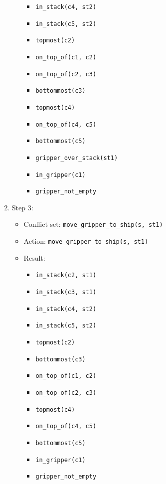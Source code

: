 \documentclass[12pt]{article}
\begin{document}
\begin{enumerate}
\begin{itemize}
\begin{itemize}
          \item \texttt{in\_stack(c4, st2)}
          \item \texttt{in\_stack(c5, st2)}
          \item \texttt{topmost(c2)}
          \item \texttt{on\_top\_of(c1, c2)}
          \item \texttt{on\_top\_of(c2, c3)}
          \item \texttt{bottommost(c3)}
          \item \texttt{topmost(c4)}
          \item \texttt{on\_top\_of(c4, c5)}
          \item \texttt{bottommost(c5)}
          \item \texttt{gripper\_over\_stack(st1)}
          \item \texttt{in\_gripper(c1)}
          \item \texttt{gripper\_not\_empty}
        \end{itemize}
    \end{itemize}
  \item Step 3:
    \begin{itemize}
      \item Conflict set: \texttt{move\_gripper\_to\_ship(s, st1)}
      \item Action: \texttt{move\_gripper\_to\_ship(s, st1)}
      \item Result:
        \begin{itemize}
          \item \texttt{in\_stack(c2, st1)}
          \item \texttt{in\_stack(c3, st1)}
          \item \texttt{in\_stack(c4, st2)}
          \item \texttt{in\_stack(c5, st2)}
          \item \texttt{topmost(c2)}
          \item \texttt{bottommost(c3)}
          \item \texttt{on\_top\_of(c1, c2)}
          \item \texttt{on\_top\_of(c2, c3)}
          \item \texttt{topmost(c4)}
          \item \texttt{on\_top\_of(c4, c5)}
          \item \texttt{bottommost(c5)}
          \item \texttt{in\_gripper(c1)}
          \item \texttt{gripper\_not\_empty}

\end{itemize}
\end{itemize}
\end{enumerate}
\end{document}
